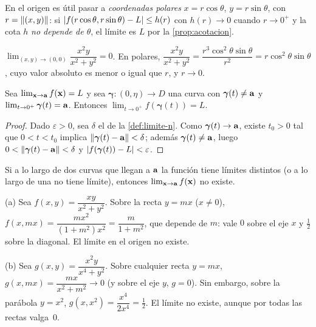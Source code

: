 En el origen es útil pasar a \emph{coordenadas polares} $x=r\cos\theta$, $y=r\sin\theta$, con $r=\lVert(x,y)\rVert$: si $\lvert f(r\cos\theta,r\sin\theta)-L\rvert\le h(r)$ con $h(r)\to0$ cuando $r\to0^+$ y la cota $h$ \emph{no depende de $\theta$}, el límite es $L$ por la \cref{prop:acotacion}.

\begin{ejemplo}\label{ej:t3-polares}
$\lim_{(x,y)\to(0,0)}\dfrac{x^2y}{x^2+y^2}=0$. En polares, $\dfrac{x^2y}{x^2+y^2}=\dfrac{r^3\cos^2\theta\sin\theta}{r^2}=r\cos^2\theta\sin\theta$, cuyo valor absoluto es menor o igual que $r$, y $r\to0$.
\end{ejemplo}

\begin{teorema}\label{teo:trayectorias}
Sea $\lim_{\mathbf{x}\to\mathbf{a}}f(\mathbf{x})=L$ y sea $\boldsymbol\gamma:(0,\eta)\to D$ una curva con $\boldsymbol\gamma(t)\neq\mathbf{a}$ y $\lim_{t\to0^+}\boldsymbol\gamma(t)=\mathbf{a}$. Entonces $\lim_{t\to0^+}f(\boldsymbol\gamma(t))=L$.
\end{teorema}

\begin{proof}
Dado $\varepsilon>0$, sea $\delta$ el de la \cref{def:limite-n}. Como $\boldsymbol\gamma(t)\to\mathbf{a}$, existe $t_0>0$ tal que $0<t<t_0$ implica $\lVert\boldsymbol\gamma(t)-\mathbf{a}\rVert<\delta$; además $\boldsymbol\gamma(t)\neq\mathbf{a}$, luego $0<\lVert\boldsymbol\gamma(t)-\mathbf{a}\rVert<\delta$ y $\lvert f(\boldsymbol\gamma(t))-L\rvert<\varepsilon$.
\end{proof}

\begin{corolario}\label{cor:no-existe}
Si a lo largo de dos curvas que llegan a $\mathbf{a}$ la función tiene límites distintos (o a lo largo de una no tiene límite), entonces $\lim_{\mathbf{x}\to\mathbf{a}}f(\mathbf{x})$ no existe.
\end{corolario}

\begin{ejemplo}\label{ej:t3-no-existe}
(a) Sea $f(x,y)=\dfrac{xy}{x^2+y^2}$. Sobre la recta $y=mx$ ($x\neq0$), $f(x,mx)=\dfrac{mx^2}{(1+m^2)x^2}=\dfrac{m}{1+m^2}$, que depende de $m$: vale $0$ sobre el eje $x$ y $\tfrac12$ sobre la diagonal. El límite en el origen no existe.

(b) Sea $g(x,y)=\dfrac{x^2y}{x^4+y^2}$. Sobre cualquier recta $y=mx$, $g(x,mx)=\dfrac{mx}{x^2+m^2}\to0$ (y sobre el eje $y$, $g=0$). Sin embargo, sobre la parábola $y=x^2$, $g(x,x^2)=\dfrac{x^4}{2x^4}=\tfrac12$. El límite no existe, aunque por todas las rectas valga~0.
\end{ejemplo}

